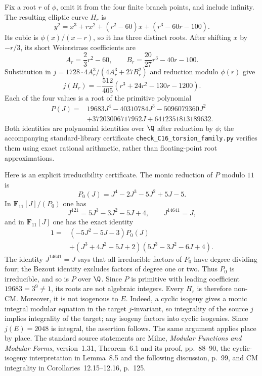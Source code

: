 Fix a root $r$ of $\phi$, omit it from the four finite branch points, and
include infinity.  The resulting elliptic curve $H_r$ is
\[
 y^2=x^3+rx^2+(r^2-60)x+(r^3-60r-100).
\]
Its cubic is $\phi(x)/(x-r)$, so it has three distinct roots.  After
shifting $x$ by $-r/3$, its short Weierstrass coefficients are
\[
 A_r=\frac23r^2-60,\qquad
 B_r=\frac{20}{27}r^3-40r-100.
\]
Substitution in $j=1728\cdot4A_r^3/(4A_r^3+27B_r^2)$ and reduction
modulo $\phi(r)$ give
\[
 j(H_r)=-\frac{512}{405}
       (r^3+24r^2-130r-1200).
\]
Each of the four values is a root of the primitive polynomial
\begin{align*}
 P(J)={}&19683J^4-40310784J^3-5096079360J^2\\
        &+37203006717952J+6412351813189632.
\end{align*}
Both identities are polynomial identities over $\Q$ after reduction by
$\phi$; the accompanying standard-library certificate
\texttt{check\_C16\_torsion\_family.py} verifies them using exact rational
arithmetic, rather than floating-point root approximations.

Here is an explicit irreducibility certificate.  The monic reduction of
$P$ modulo $11$ is
\[
 P_0(J)=J^4-2J^3-5J^2+5J-5.
\]
In $\mathbf F_{11}[J]/(P_0)$ one has
\[
 J^{121}=5J^3-3J^2-5J+4,
 \qquad J^{14641}=J,
\]
and in $\mathbf F_{11}[J]$ one has the exact identity
\begin{align*}
 1={}&(-5J^2-5J-3)P_0(J)\\
 &+(J^3+4J^2-5J+2)(5J^3-3J^2-6J+4).
\end{align*}
The identity $J^{14641}=J$ says that all irreducible factors of $P_0$
have degree dividing four; the Bezout identity excludes factors of degree
one or two.  Thus $P_0$ is irreducible, and so is $P$ over $\Q$.
Since $P$ is primitive with leading coefficient $19683=3^9\neq1$,
its roots are not algebraic integers.  Every $H_r$ is therefore non-CM.
Moreover, it is not isogenous to $E$.  Indeed, a cyclic isogeny gives a
monic integral modular equation in the target $j$-invariant, so integrality
of the source $j$ implies integrality of the target; any isogeny factors
into cyclic isogenies.  Since $j(E)=2048$ is integral, the assertion follows.
The same argument applies place by place.  The standard source statements
are Milne, \emph{Modular Functions and Modular Forms}, version~1.31,
Theorem~6.1 and its proof, pp.~88--90, the cyclic-isogeny interpretation
in Lemma~8.5 and the following discussion, p.~99, and CM integrality in
Corollaries~12.15--12.16, p.~125.

